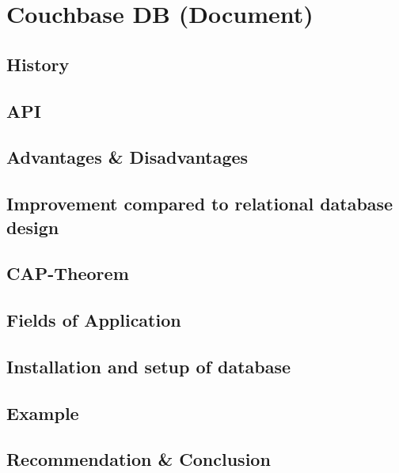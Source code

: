 
\chapter{Couchbase DB (Document)} \label{ch:couchebase}

\section{History}

\section{API}

\section{Advantages \& Disadvantages}

\section{Improvement compared to relational database design}

\section{\ac{CAP}-Theorem}

\section{Fields of Application}

\section{Installation and setup of database}

\section{Example}

\section{Recommendation \& Conclusion}